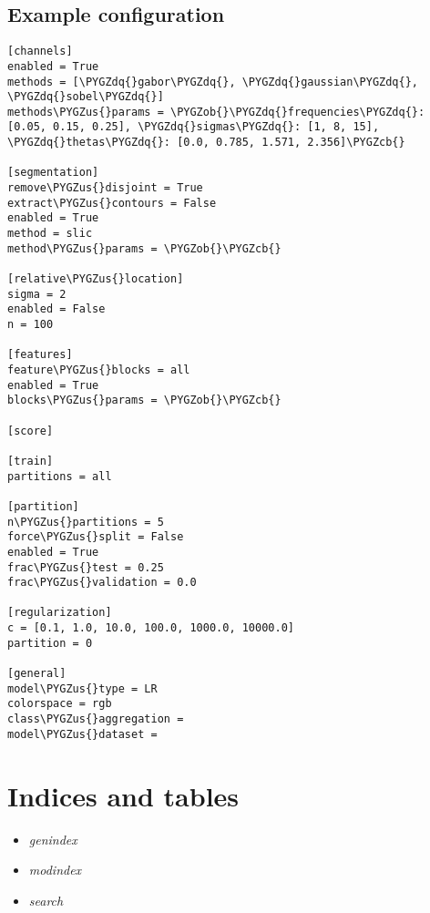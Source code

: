\documentclass[letterpaper,10pt,english]{sphinxmanual}
\def\PYGZus{\char`\_}
\def\PYGZob{\char`\{}
\def\PYGZcb{\char`\}}
\def\PYGZdq{\char`\"}
\begin{document}
\section{Example configuration}
\label{index:example-configuration}
\begin{Verbatim}[commandchars=\\\{\}]
[channels]
enabled = True
methods = [\PYGZdq{}gabor\PYGZdq{}, \PYGZdq{}gaussian\PYGZdq{}, \PYGZdq{}sobel\PYGZdq{}]
methods\PYGZus{}params = \PYGZob{}\PYGZdq{}frequencies\PYGZdq{}: [0.05, 0.15, 0.25], \PYGZdq{}sigmas\PYGZdq{}: [1, 8, 15], \PYGZdq{}thetas\PYGZdq{}: [0.0, 0.785, 1.571, 2.356]\PYGZcb{}

[segmentation]
remove\PYGZus{}disjoint = True
extract\PYGZus{}contours = False
enabled = True
method = slic
method\PYGZus{}params = \PYGZob{}\PYGZcb{}

[relative\PYGZus{}location]
sigma = 2
enabled = False
n = 100

[features]
feature\PYGZus{}blocks = all
enabled = True
blocks\PYGZus{}params = \PYGZob{}\PYGZcb{}

[score]

[train]
partitions = all

[partition]
n\PYGZus{}partitions = 5
force\PYGZus{}split = False
enabled = True
frac\PYGZus{}test = 0.25
frac\PYGZus{}validation = 0.0

[regularization]
c = [0.1, 1.0, 10.0, 100.0, 1000.0, 10000.0]
partition = 0

[general]
model\PYGZus{}type = LR
colorspace = rgb
class\PYGZus{}aggregation = 
model\PYGZus{}dataset =
\end{Verbatim}


\chapter{Indices and tables}
\label{index:indices-and-tables}\begin{itemize}
\item {} 
\emph{genindex}

\item {} 
\emph{modindex}

\item {} 
\emph{search}

\end{itemize}

\begin{thebibliography}{Gould2008}
\end{thebibliography}
\end{document}
